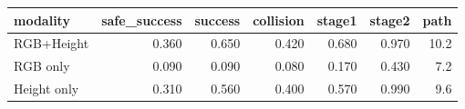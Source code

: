 \begin{tabular}{lrrrrrr}
\toprule
modality & safe_success & success & collision & stage1 & stage2 & path \\
\midrule
RGB+Height & 0.360 & 0.650 & 0.420 & 0.680 & 0.970 & 10.2 \\
RGB only & 0.090 & 0.090 & 0.080 & 0.170 & 0.430 & 7.2 \\
Height only & 0.310 & 0.560 & 0.400 & 0.570 & 0.990 & 9.6 \\
\bottomrule
\end{tabular}
